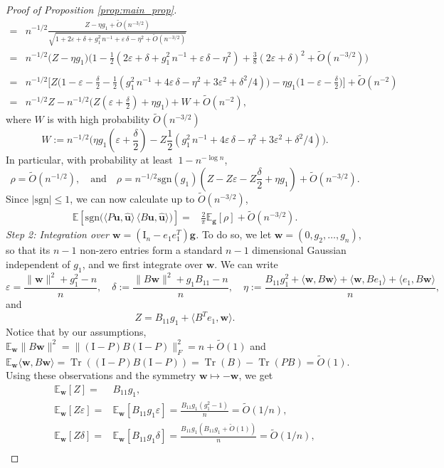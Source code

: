 \documentclass[reqno]{amsart}
\numberwithin{equation}{section}
\newcommand\E{\mathbb{E}}
\newcommand\bg{\bm{g}}
\newcommand\bw{\bm{w}}
\newcommand\rem{\tilde{O}\left(n^{-3/2}\right)}
\newcommand\bu{\bm{u}}
\newcommand\hu{\hat{\bm u}}
\newcommand\eps{\varepsilon}
\newcommand\Tr{{\operatorname{Tr}}}
\begin{document}
\begin{proof}[Proof of Proposition \ref{prop:main_prop}]
\begin{align*}
= &    n^{-1/2}\frac{Z-\eta g_1+\rem}{\sqrt{1+2\eps+\delta+g_{1}^2\,n^{-1}+\eps\,\delta-\eta^2+\rem}}\\
= &    n^{-1/2}\big(Z-\eta g_1\big)\big(1-\frac{1}{2}(2\eps+\delta+g_{1}^2\,n^{-1}+\eps\,\delta-\eta^2)+\frac{3}{8}(2\eps+\delta)^2+\rem\big)\\
\\
= &    n^{-1/2}\big[Z\big(1-\eps-\frac{\delta}{2}-\frac{1}{2}(g_{1}^2\,n^{-1}+4\eps\,\delta-\eta^2+3\eps^2+\delta^{2}/4)\big)-\eta g_{1}\big(1-\eps-\frac{\delta}{2}\big)\big]+\tilde{O}(n^{-2})\\
= &    n^{-1/2}Z-n^{-1/2}\big(Z(\eps+\frac{\delta}{2})+\eta g_{1}\big)+W+\tilde{O}(n^{-2}),
\end{align*}
where $W$ is with high probability $\rem$
\[W:=n^{-1/2}\big(\eta g_1(\eps+\frac{\delta}{2})-Z\frac{1}{2}(g_{1}^2\,n^{-1}+4\eps\,\delta-\eta^2+3\eps^2+\delta^{2}/4)\big).\]
In particular, with probability at least  $\ 1-n^{-\log n}$,
\[\rho=\tilde{O}(n^{-1/2}),\quad\text{and} \quad\rho=n^{-1/2}\mathrm{sgn}(g_{1})\left(Z-Z\eps-Z\frac{\delta}{2}+\eta g_1\right)+\rem. \]
Since $|\mathrm{sgn}| \leq 1$, we can now calculate up to $\rem$,
\begin{align*}
    \E\!\left[\mathrm{sgn}\!\big(\langle P\bu,\hu\rangle\,
\langle B\bu,\hu\rangle\big)\right]
= & \frac{2}{\pi}\E_{\bg}[\rho]+\rem.
\end{align*}
\emph{Step 2: Integration over $\bw=(\mathrm{I}_{n}-e_{1}e_{1}^{T})\bg$.}
To do so, we let $\bw=(0,g_{2},\ldots,g_{n})$, so that its $n-1$ non-zero entries form a standard $n-1$ dimensional Gaussian independent of $g_1$, and we first integrate over $\bw$. We can write 
\[\eps=\frac{\|\bw\|^2+g_{1}^2-n}{n},\quad \delta:=\frac{\|B\bw\|^2+g_{1}B_{11}-n}{n},\quad \eta:=\frac{B_{11}g_{1}^2+\langle\bw,B\bw\rangle+\langle\bw,Be_{1}\rangle+\langle e_{1},B\bw\rangle}{n},\]
and
\[Z=B_{11}g_{1}+\langle B^{T}e_{1},\bw\rangle.\]
Notice that by our assumptions, $\E_{\bw}\|B\bw\|^2=\|(\mathrm{I}-P)B(\mathrm{I}-P)\|_{F}^2=n+\tilde{O}(1)$ and $\E_{\bw}\langle \bw,B\bw\rangle=\Tr((\mathrm{I}-P)B(\mathrm{I}-P))=\Tr(B)-\Tr(PB)=\tilde{O}(1)$. Using these observations and the symmetry $\bw\mapsto-\bw$, we get  
\begin{align*}
\E_{\bw}[Z]=& B_{11}g_{1},\\
\E_{\bw}[Z\eps]=& \E_{\bw}[B_{11}g_{1}\eps]=\frac{B_{11}g_{1}(g_{1}^2-1)}{n}=\tilde{O}(1/n),\\
\E_{\bw}[Z\delta]=& \E_{\bw}[B_{11}g_{1}\delta]=\frac{B_{11}g_{1}(B_{11}g_{1}+\tilde{O}(1))}{n}=\tilde{O}(1/n),\\

\end{align*}
\end{proof}
\end{document}
